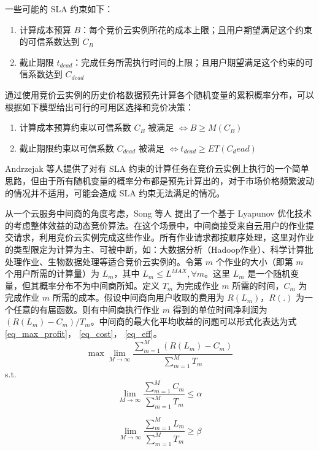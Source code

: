 一些可能的 SLA 约束如下：
\begin{enumerate}
\item 计算成本预算 $B$：每个竞价云实例所花的成本上限；且用户期望满足这个约束的可信系数达到 $C_B$
\item 截止期限 $t_{dead}$：完成任务所需执行时间的上限；且用户期望满足这个约束的可信系数达到 $C_{dead}$
\end{enumerate}

通过使用竞价云实例的历史价格数据预先计算各个随机变量的累积概率分布，可以根据如下模型给出可行的可用区选择和竞价决策：
\begin{enumerate}
\item 计算成本预算约束以可信系数 $C_B$ 被满足 $\iff B \geq M(C_B)$
\item 截止期限约束以可信系数 $C_{dead}$ 被满足 $\iff t_{dead} \geq ET(C_dead)$
\end{enumerate}

Andrzejak 等人提供了对有 SLA 约束的计算任务在竞价云实例上执行的一个简单思路，但由于所有随机变量的概率分布都是预先计算出的，对于市场价格频繁波动的情况并不适用，可能会造成 SLA 约束无法满足的情况。

从一个云服务中间商的角度考虑，Song 等人 \cite{song2012optimal} 提出了一个基于 Lyapunov 优化技术的考虑整体效益的动态竞价算法。在这个场景中，中间商接受来自云用户的作业提交请求，利用竞价云实例完成这些作业。所有作业请求都按顺序处理，这里对作业的类型限定为计算为主、可被中断，如：大数据分析（Hadoop作业）、科学计算批处理作业、生物数据处理等适合竞价云实例的。令第 $m$ 个作业的大小（即第 $m$ 个用户所需的计算量）为 $L_m$，其中 $L_m \leq L^{MAX}, \forall m$。这里 $L_m$ 是一个随机变量，但其概率分布不为中间商所知。定义 $T_m$ 为完成作业 $m$ 所需的时间，$C_m$ 为完成作业 $m$ 所需的成本。假设中间商向用户收取的费用为 $R(L_m)$，$R(.)$ 为一个任意的有届函数。则有中间商执行作业 $m$ 得到的单位时间净利润为 $(R(L_m) - C_m)/T_m$。中间商的最大化平均收益的问题可以形式化表达为式 \eqref{eq_max_profit}， \eqref{eq_cost}， \eqref{eq_eff}。
\begin{equation}\label{eq_max_profit} 
\max \lim_{M \rightarrow \infty}{\frac{\sum_{m=1}^M(R(L_m)-C_m)}{\sum_{m=1}^MT_m}}  
\end{equation}
s.t.
\begin{equation}\label{eq_cost} 
\lim_{M \rightarrow \infty}{\frac{\sum_{m=1}^MC_m}{\sum_{m=1}^MT_m}} \leq \alpha 
\end{equation}

\begin{equation}\label{eq_eff}
\lim_{M \rightarrow \infty}{\frac{\sum_{m=1}^ML_m}{\sum_{m=1}^MT_m}} \geq \beta 
\end{equation}

